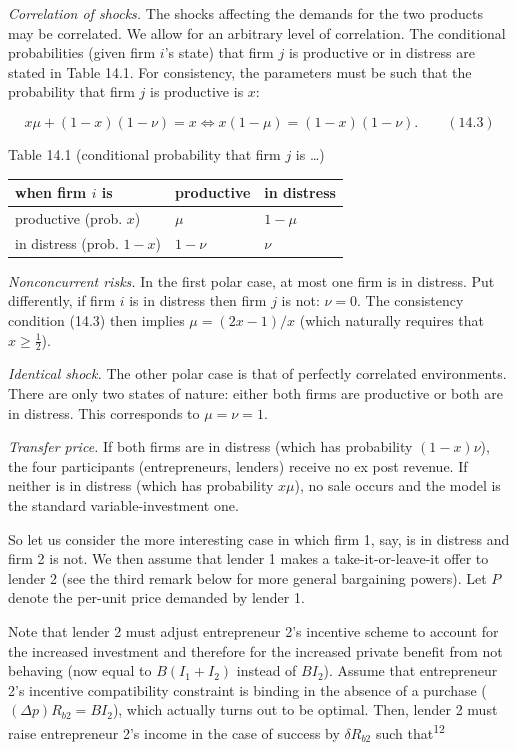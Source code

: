 \documentclass[11pt,a4paper]{article}
\begin{document}
\emph{Correlation of shocks.} The shocks affecting the demands for the two products may be
correlated. We allow for an arbitrary level of correlation. The conditional probabilities (given
firm \(i\)'s state) that firm \(j\) is productive or in distress are stated in Table 14.1. For
consistency, the parameters must be such that the probability that firm \(j\) is productive is
\(x\):

\[x\mu + (1 - x)(1 - \nu) = x \iff x(1 - \mu) = (1 - x)(1 - \nu). \qquad (14.3)\]

Table 14.1 (conditional probability that firm \(j\) is \ldots)

{\def\LTcaptype{none} %
\begin{longtable}[]{@{}lll@{}}
\toprule\noalign{}
when firm \(i\) is & productive & in distress \\
\midrule\noalign{}
\endhead
\bottomrule\noalign{}
\endlastfoot
productive (prob. \(x\)) & \(\mu\) & \(1 - \mu\) \\
in distress (prob. \(1 - x\)) & \(1 - \nu\) & \(\nu\) \\
\end{longtable}
}

\emph{Nonconcurrent risks.} In the first polar case, at most one firm is in distress. Put
differently, if firm \(i\) is in distress then firm \(j\) is not: \(\nu = 0\). The consistency
condition (14.3) then implies \(\mu = (2x - 1)/x\) (which naturally requires that
\(x \geqslant \frac12\)).

\emph{Identical shock.} The other polar case is that of perfectly correlated environments. There are
only two states of nature: either both firms are productive or both are in distress. This
corresponds to \(\mu = \nu = 1\).

\emph{Transfer price.} If both firms are in distress (which has probability \((1 - x)\nu\)), the
four participants (entrepreneurs, lenders) receive no ex post revenue. If neither is in distress
(which has probability \(x\mu\)), no sale occurs and the model is the standard variable-investment
one.

So let us consider the more interesting case in which firm 1, say, is in distress and firm 2 is not.
We then assume that lender 1 makes a take-it-or-leave-it offer to lender 2 (see the third remark
below for more general bargaining powers). Let \(P\) denote the per-unit price demanded by lender 1.

Note that lender 2 must adjust entrepreneur 2's incentive scheme to account for the increased
investment and therefore for the increased private benefit from not behaving (now equal to
\(B(I_1 + I_2)\) instead of \(BI_2\)). Assume that entrepreneur 2's incentive compatibility
constraint is binding in the absence of a purchase (\((\Delta p)R_{b2} = BI_2\)), which actually
turns out to be optimal. Then, lender 2 must raise entrepreneur 2's income in the case of success by
\(\delta R_{b2}\) such that\textsuperscript{12}
\end{document}
